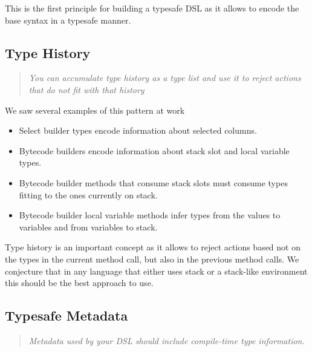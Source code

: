\documentclass{sig-alternate}
\begin{document}
This is the first principle for building a typesafe DSL as it allows to encode the base syntax in a typesafe manner.

\subsection{Type History}

\begin{quote}
\emph{You can accumulate type history as a type list and use it to reject actions that do not fit with that history}
\end{quote}

We saw several examples of this pattern at work
\begin{itemize}
\item Select builder types encode information about selected columns. 
\item Bytecode builders encode information about stack slot and local variable types.
\item Bytecode builder methods that consume stack slots must consume types fitting to the ones currently on stack.
\item Bytecode builder local variable methods infer types from the values to variables and from variables to stack.
\end{itemize}

Type history is an important concept as it allows to reject actions based not on the types in the current method call, but also in the previous method calls. We conjecture that in any language that either uses stack or a stack-like environment this should be the best approach to use.

\subsection{Typesafe Metadata}

\begin{quote}
\emph{Metadata used by your DSL should include compile-time type information.}
\end{quote}
\end{document}
